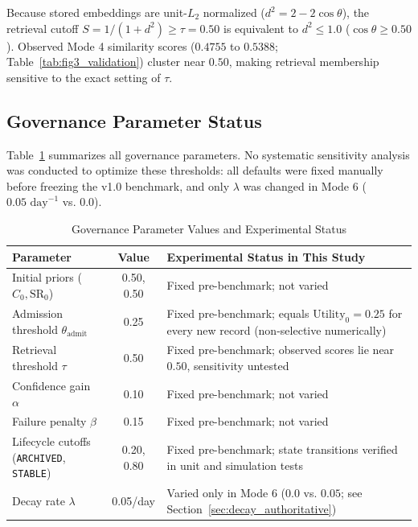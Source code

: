 Because stored embeddings are unit-$L_2$ normalized ($d^2 = 2 - 2\cos\theta$), the retrieval cutoff $S = 1/(1+d^2) \ge \tau = 0.50$ is equivalent to $d^2 \le 1.0$ ($\cos\theta \ge 0.50$). Observed Mode 4 similarity scores ($0.4755$ to $0.5388$; Table~\ref{tab:fig3_validation}) cluster near $0.50$, making retrieval membership sensitive to the exact setting of $\tau$.

\subsection{Governance Parameter Status}
Table~\ref{tab:params} summarizes all governance parameters. No systematic sensitivity analysis was conducted to optimize these thresholds: all defaults were fixed manually before freezing the v1.0 benchmark, and only $\lambda$ was changed in Mode 6 ($0.05\text{ day}^{-1}$ vs. $0.0$).

\begin{table}[t]
\centering
\caption{Governance Parameter Values and Experimental Status}
\label{tab:params}
\footnotesize
\setlength{\tabcolsep}{3pt}
\renewcommand{\arraystretch}{1.04}
\begin{tabularx}{\columnwidth}{@{}>{\raggedright\arraybackslash}p{2.7cm} c >{\raggedright\arraybackslash}X@{}}
\toprule
\textbf{Parameter} & \textbf{Value} & \textbf{Experimental Status in This Study} \\
\midrule
Initial priors ($C_0, \text{SR}_0$) & 0.50, 0.50 & Fixed pre-benchmark; not varied \\
Admission threshold $\theta_{\text{admit}}$ & 0.25 & Fixed pre-benchmark; equals $\text{Utility}_0 = 0.25$ for every new record (non-selective numerically) \\
Retrieval threshold $\tau$ & 0.50 & Fixed pre-benchmark; observed scores lie near $0.50$, sensitivity untested \\
Confidence gain $\alpha$ & 0.10 & Fixed pre-benchmark; not varied \\
Failure penalty $\beta$ & 0.15 & Fixed pre-benchmark; not varied \\
Lifecycle cutoffs (\texttt{ARCHIVED}, \texttt{STABLE}) & 0.20, 0.80 & Fixed pre-benchmark; state transitions verified in unit and simulation tests \\
Decay rate $\lambda$ & 0.05/day & Varied only in Mode 6 ($0.0$ vs. $0.05$; see Section~\ref{sec:decay_authoritative}) \\
\bottomrule
\end{tabularx}
\end{table}


